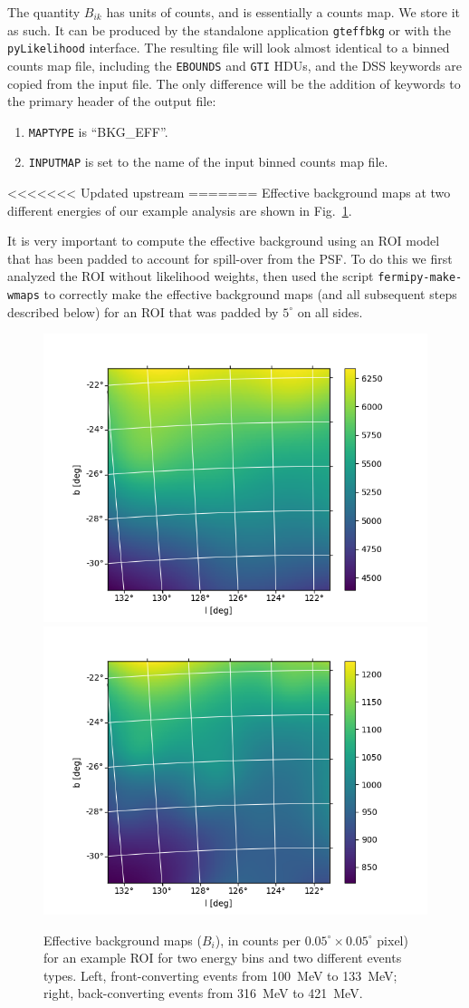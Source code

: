 \documentclass[preprint]{aastex}
\begin{document}
The quantity $B_{ik}$ has units of counts, and is essentially a counts
map.  We store it as such.  It can be produced by the standalone
application {\tt gteffbkg} or with the {\tt pyLikelihood} interface.
The resulting file will look almost identical to a binned counts map
file, including the {\tt EBOUNDS} and {\tt GTI} HDUs, and the DSS
keywords are copied from the input file.  The only difference will be
the addition of keywords to the primary header of the output file:

\begin{enumerate}
\item{{\tt MAPTYPE} is ``BKG\_EFF''.}
\item{{\tt INPUTMAP} is set to the name of the input binned counts map
file.}
\end{enumerate}

<<<<<<< Updated upstream
=======
Effective background maps at two different energies of our example analysis are shown in 
Fig.~\ref{fig:beff}. 

It is very important to compute the effective background using an ROI 
model that has been padded to account for spill-over from the PSF.  To do this
we first analyzed the ROI without likelihood weights, then used the
script {\tt fermipy-make-wmaps} to correctly make the effective
background maps (and all subsequent steps described below) for an ROI that 
was padded by $5^\circ$ on all sides.

\begin{figure}[h]  
\begin{centering}
\includegraphics[width=0.49\columnwidth]{figures/beff_E00_00.png}
\includegraphics[width=0.49\columnwidth]{figures/beff_E01_04.png}
\vspace{-0.10in}
\caption{\label{fig:beff}Effective background maps ($B_{i}$), in counts per 
  $0.05^\circ\times0.05^\circ$ pixel) for an example ROI
  for two energy bins and two different events types.  Left, front-converting events 
  from 100~MeV to 133~MeV; right, back-converting events from 316~MeV to 421~MeV.}
\end{centering}
\end{figure}
\end{document}
